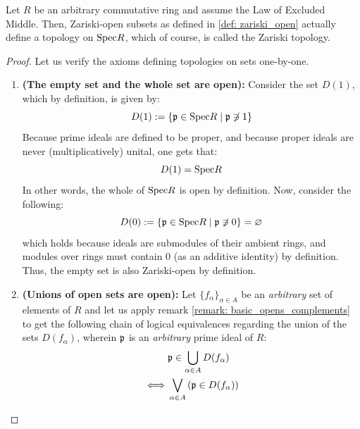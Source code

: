                 \begin{proposition} \label{prop: zariski_open_well_definiteness}
                    Let $R$ be an arbitrary commutative ring and assume the Law of Excluded Middle. Then, Zariski-open subsets as defined in \ref{def: zariski_open} actually define a topology on $\Spec R$, which of course, is called the Zariski topology.
                \end{proposition}
                    \begin{proof}
                        Let us verify the axioms defining topologies on sets one-by-one.
                            \begin{enumerate}
                                \item \textbf{(The empty set and the whole set are open):} Consider the set $D(1)$, which by definition, is given by:
                                    $$D(1) := \{\p \in \Spec R \mid \p \not \ni 1\}$$
                                Because prime ideals are defined to be proper, and because proper ideals are never (multiplicatively) unital, one gets that:
                                    $$D(1) = \Spec R$$
                                In other words, the whole of $\Spec R$ is open by definition. Now, consider the following:
                                    $$D(0) := \{\p \in \Spec R \mid \p \not \ni 0\} = \varnothing$$
                                which holds because ideals are submodules of their ambient rings, and modules over rings must contain $0$ (as an additive identity) by definition. Thus, the empty set is also Zariski-open by definition. 
                                \item \textbf{(Unions of open sets are open):} Let $\{f_{\alpha}\}_{\alpha \in A}$ be an \textit{arbitrary} set of elements of $R$ and let us apply remark \ref{remark: basic_opens_complements} to get the following chain of logical equivalences regarding the union of the sets $D(f_{\alpha})$, wherein $\p$ is an \textit{arbitrary} prime ideal of $R$:
                                    $$
                                        \begin{aligned}
                                            & \p \in \bigcup_{\alpha \in A} D(f_{\alpha})
                                            \\
                                            \iff & \bigvee_{\alpha \in A} \left(\p \in D(f_{\alpha})\right)
                                            \\

\end{aligned}$$
\end{enumerate}
\end{proof}

